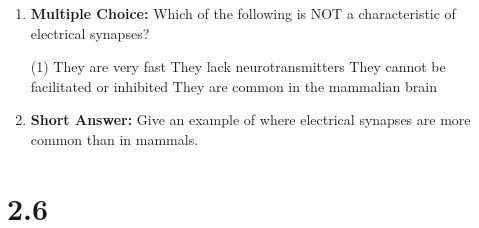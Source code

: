 \begin{enumerate}[label=\textbf{Q2.5.\arabic*}]
      \item \textbf{Multiple Choice:} Which of the following is NOT a characteristic of electrical synapses?
            \begin{tasks}[label=\textcolor{draculafg}{(\Alph*)}, item-format=\color{draculafg}, label-width=1.5em, item-indent=1.7em](1)
                  \task They are very fast
                  \task They lack neurotransmitters
                  \task They cannot be facilitated or inhibited
                  \task They are common in the mammalian brain
            \end{tasks}
            
      \item \textbf{Short Answer:} Give an example of where electrical synapses are more common than in mammals. \\
\end{enumerate}
\newpage
\squigglyline


\section*{2.6}

